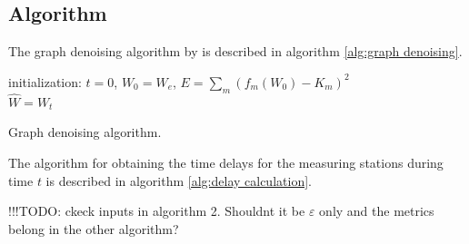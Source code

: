 \documentclass[12pt, sumlimits, intlimits]{article}
\newcommand\todo[1]{{\color{red}!!!TODO: #1}}
\begin{document}
\subsection{Algorithm}
The graph denoising algorithm by \cite{Spyrou2017} is described in algorithm \ref{alg:graph denoising}. 

\begin{algorithm}[H]
	initialization: $t = 0$, $W_0 = W_e$, $E = \sum_{m}(f_m(W_0) - K_m)^2$\\
	$\hat{W} = W_t$
	\caption{Graph denoising algorithm.}
	\label{alg:graph denoising}
\end{algorithm}

The algorithm for obtaining the time delays for the measuring stations during time $t$ is described in algorithm \ref{alg:delay calculation}.

\iffalse
\todo{ckeck inputs in algorithm 2. Shouldnt it be $\varepsilon$ only and the metrics belong in the other algorithm?}
\end{document}
